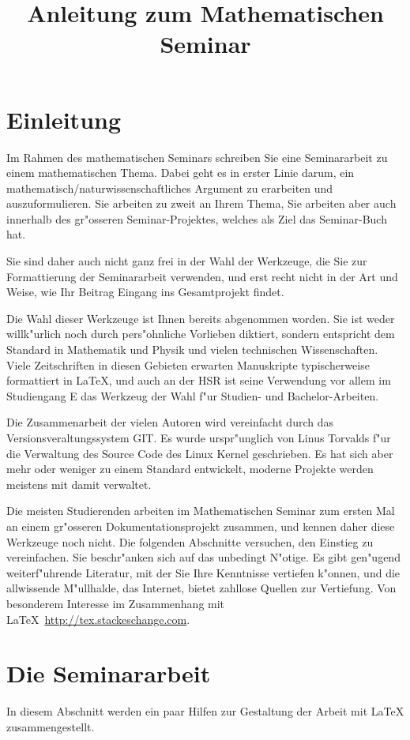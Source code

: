 \documentclass[a4paper,12pt]{article}
\begin{document}
\title{Anleitung zum Mathematischen Seminar}
\date{}
\maketitle
\section{Einleitung\label{einleitung}}
Im Rahmen des mathematischen Seminars schreiben Sie eine Seminararbeit
zu einem mathematischen Thema.
Dabei geht es in erster Linie darum, ein mathematisch/naturwissenschaftliches
Argument zu erarbeiten und auszuformulieren.
Sie arbeiten zu zweit an Ihrem Thema, Sie arbeiten aber auch 
innerhalb des gr"osseren Seminar-Projektes, welches als Ziel das
Seminar-Buch hat.

Sie sind daher auch nicht ganz frei in der Wahl der Werkzeuge, die Sie
zur Formattierung der Seminararbeit verwenden, und erst recht nicht
in der Art und Weise, wie Ihr Beitrag Eingang ins Gesamtprojekt findet.

Die Wahl dieser Werkzeuge ist Ihnen bereits abgenommen worden.
Sie ist weder willk"urlich noch durch pers"ohnliche Vorlieben diktiert,
sondern entspricht dem Standard in Mathematik und Physik und vielen
technischen Wissenschaften.
Viele Zeitschriften in diesen Gebieten erwarten Manuskripte typischerweise
formattiert in \LaTeX, und auch an der HSR ist seine Verwendung 
vor allem im Studiengang E das Werkzeug der Wahl f"ur Studien- und
Bachelor-Arbeiten.

Die Zusammenarbeit der vielen Autoren wird vereinfacht durch das
Versionsveraltungssystem GIT.
Es wurde urspr"unglich von Linus Torvalds f"ur die Verwaltung des
Source Code des Linux Kernel geschrieben.
Es hat sich aber mehr oder weniger zu einem Standard entwickelt,
moderne Projekte werden meistens mit damit verwaltet.

Die meisten Studierenden arbeiten im Mathematischen Seminar zum ersten
Mal an einem gr"osseren Dokumentationsprojekt zusammen, und kennen daher
diese Werkzeuge noch nicht.
Die folgenden Abschnitte versuchen, den Einstieg zu vereinfachen.
Sie beschr"anken sich auf das unbedingt N"otige.
Es gibt gen"ugend weiterf"uhrende Literatur, mit der Sie Ihre Kenntnisse
vertiefen k"onnen, und die allwissende M"ullhalde, das Internet,
bietet zahllose Quellen zur Vertiefung.
Von besonderem Interesse im Zusammenhang mit
\LaTeX\ \url{http://tex.stackeschange.com}.

\section{Die Seminararbeit\label{seminararbeit}}
In diesem Abschnitt werden ein paar Hilfen zur Gestaltung der Arbeit
mit \LaTeX{} zusammengestellt.
\end{document}
